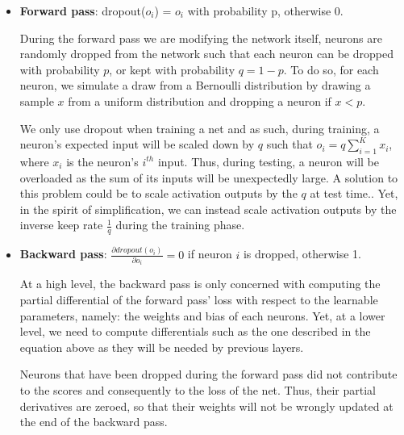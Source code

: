 \begin{itemize}[topsep=-10pt]
\item \textbf{Forward pass}: dropout($o_i$) = $o_i$ with probability p, otherwise 0.
  
During the forward pass we are modifying the network itself,
neurons are randomly dropped from the network such that each neuron can be dropped with probability $p$,
or kept with probability $q = 1- p$.
To do so, for each neuron, we simulate a draw from a Bernoulli distribution by drawing a sample $x$ from a uniform distribution
and dropping a neuron if $x < p$.

We only use dropout when training a net and as such, during training, a neuron's expected input will be scaled down by $q$ such that $o_i = q\sum_{i=1}^K x_i$, where $x_i$ is the neuron's $i^{th}$ input.
Thus, during testing, a neuron will be overloaded as the sum of its inputs will be unexpectedly large.
A solution to this problem could be to scale activation outputs by the $q$ at test time..
Yet, in the spirit of simplification,
we can instead scale activation outputs by the inverse keep rate $\frac{1}{q}$ during the training phase.


\item \textbf{Backward pass}: $\frac{\partial dropout(o_i)}{\partial o_i} = 0 $ if neuron $i$ is dropped, otherwise 1.

  At a high level, the backward pass is only concerned with computing the partial differential of the forward pass' loss with respect to the
  learnable parameters, namely: the weights and bias of each neurons.
  Yet, at a lower level, we need to compute differentials such as the one described in the equation above as they will be needed
  by previous layers.

  Neurons that have been dropped during the forward pass did not contribute to the scores and consequently to the loss of the net.
  Thus, their partial derivatives are zeroed, so that their weights will not be wrongly updated at the end of the backward pass.
\end{itemize}



